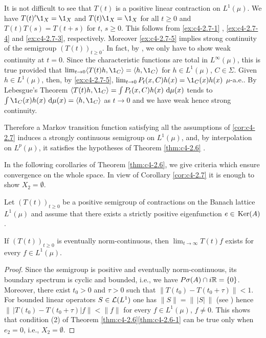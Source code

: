 \begin{example}
It is not difficult to see that $T(t)$ is a positive linear contraction on $L^{1}(\mu)$.
We have $T(t)'\1_{X} = \1_{X}$ and $T(t)\1_{X} = \1_{X}$ for all $t \geq 0$ and $T(t)T(s) = T(t+s)$ for $t$, $s \geq 0$.
This follows from \ref{ex:c4-2.7-1} , \ref{ex:c4-2.7-4} and \ref{ex:c4-2.7-3}, respectively.
Moreover \ref{ex:c4-2.7-5} implies strong continuity of the semigroup $(T(t))_{t \geq 0}$.
In fact, by \citet[Proposition 1.23]{davies:1980}, we only have to show weak continuity at $t = 0$.
Since the characteristic functions are total in $L^{\infty}(\mu)$, this is true provided that $\lim_{t \to 0} \langle T(t)h,\1_{C}\rangle = \langle h,\1_{C}\rangle$ for $h \in L^{1}(\mu)$, $C \in \Sigma$.
Given $h \in L^{1}(\mu)$, then, by \ref{ex:c4-2.7-5}, $\lim_{t \to 0} P_{t}(x,C)h(x) = \1_{C}(x)h(x)$ $\mu$-a.e..
By Lebesgue's Theorem $\langle T(t)h,\1_{C}\rangle = \int P_{t}(x,C)h(x) \, \diff{\mu(x)}$ tends to $\int \1_{C}(x)h(x) \, \diff{\mu(x)} = \langle h,\1_{C}\rangle$ as $t \to 0$ and we have weak hence strong continuity.

Therefore a Markov transition function satisfying all the assumptions of \ref{cor:c4-2.7} induces a strongly continuous semigroup on $L^{1}(\mu)$, and, by interpolation on $L^{p}(\mu)$, it satisfies the hypotheses of Theorem \ref{thm:c4-2.6} .
\end{example}

In the following corollaries of Theorem \ref{thm:c4-2.6}, we give criteria which ensure convergence on the whole space.
In view of Corollary \ref{cor:c4-2.7} it is enough to show $X_{2} = \emptyset$.

\begin{corollary}\label{cor:c4-2.9}
Let $(T(t))_{t \geq 0}$ be a positive semigroup of contractions on the Banach lattice $L^{1}(\mu)$ and assume that there exists a strictly positive eigenfunction $e \in \mathop{}\mathrm{Ker}(A)$.


If $(T(t))_{t \geq 0}$ is eventually norm-continuous, then $\lim_{t \to \infty}T(t)f$ exists for every $f \in L^{1}(\mu)$.
\end{corollary}

\begin{proof}
Since the semigroup is positive and eventually norm-continuous, its boundary spectrum is cyclic and bounded, i.e., we have $P{\sigma}(A) \cap i\mathbb{R} = \{0\}$.
Moreover, there exist $t_{0} > 0$ and $\tau > 0$ such that $\|T(t_{0}) - T(t_{0}+\tau)\| < 1$.\\
For bounded linear operators $S \in \mathcal{L}(L^{1})$ 
one has $\|S\| = \|\,|S|\,\|$ (see \citet[IV, Theorem 1.5]{schaefer:1974}) hence $\|\,|T(t_{0}) - T(t_{0}+\tau)| f\| < \|f\|$ for every $f \in L^{1}(\mu)$, $f \neq 0$.
This shows that condition (2) of Theorem \ref{thm:c4-2.6}\ref{thm:c4-2.6-1} can be true only when $e_{2} = 0$, i.e., $X_{2} = \emptyset$.
\end{proof}

